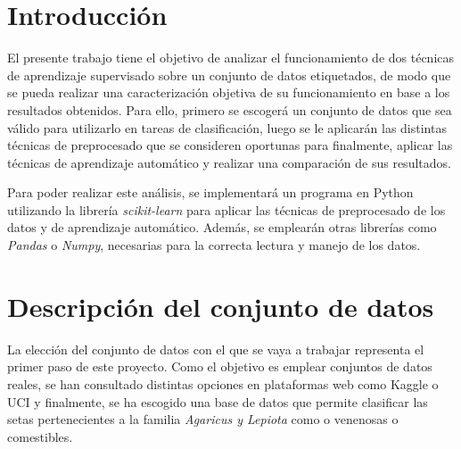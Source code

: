 \documentclass{Plantilla/Formato_EPEF}
\begin{document}
	
	
	\renewcommand{\NombreDocumento}{Índice} 
	
	\renewcommand{\contentsname}{Índice}
	
	\tableofcontents
	\newpage
	
	\renewcommand{\NombreDocumento}{Introducción}
	
\section{Introducción}
	El presente trabajo tiene el objetivo de analizar el funcionamiento de dos técnicas de aprendizaje supervisado sobre un conjunto de datos etiquetados, de modo que se pueda realizar una caracterización objetiva de su funcionamiento en base a los resultados obtenidos. 
	Para ello, primero se escogerá un conjunto de datos que sea válido para utilizarlo en tareas de clasificación, luego se le aplicarán las distintas técnicas de preprocesado que se consideren oportunas para finalmente, aplicar las técnicas de aprendizaje automático y realizar una comparación de sus resultados.
	
	Para poder realizar este análisis, se implementará un programa en Python utilizando la librería \textit{scikit-learn} para aplicar las técnicas de preprocesado de los datos y de aprendizaje automático. Además, se emplearán otras librerías como \textit{Pandas} o \textit{Numpy}, necesarias para la correcta lectura y manejo de los datos.
	
\section{Descripción del conjunto de datos}
\renewcommand{\NombreDocumento}{Descripción de conjunto de datos}
La elección del conjunto de datos con el que se vaya a trabajar representa el primer paso de este proyecto. Como el objetivo es emplear conjuntos de datos reales, se han consultado distintas opciones en plataformas web como Kaggle o UCI y finalmente, se ha escogido una base de datos que permite clasificar las setas pertenecientes a la familia \textit{Agaricus y Lepiota} como o venenosas o comestibles. \cite{Dataset}
\end{document}

